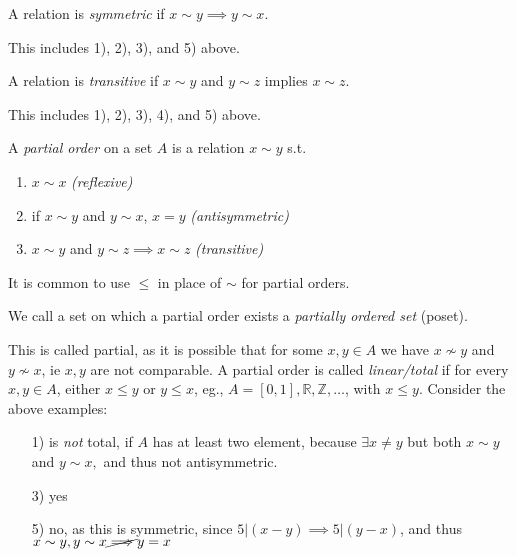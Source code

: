 \documentclass[12pt,oneside]{article}
\begin{document}
\begin{definition}[Symmetric]
  A relation is \emph{symmetric} if $x \sim y \implies y \sim x$.

  This includes 1), 2), 3), and 5) above.
\end{definition}

\begin{definition}[Transitive]
  A relation is \emph{transitive} if $x \sim y$ and $y \sim z$ implies $x \sim z$.

  This includes 1), 2), 3), 4), and 5) above.
\end{definition}

\begin{definition}
  A \emph{partial order} on a set $A$ is a relation $x \sim y$ s.t.
  \begin{enumerate}
    \item $x \sim x$ \textit{(reflexive)}
    \item if $x \sim y$ and $y \sim x$, $x = y$ \textit{(antisymmetric)}
    \item $x \sim y$ and $y \sim z \implies x \sim z$ \textit{(transitive)}
  \end{enumerate}
  It is common to use $\leq$ in place of $\sim$ for partial orders.

  We call a set on which a partial order exists a \emph{partially ordered set} (poset).

  This is called partial, as it is possible that for some $x,y \in A$ we have $x \nsim y$ and $y \nsim x$, ie $x,y$ are not comparable. A partial order is called \emph{linear/total} if for every $x,y\in A$, either $x \leq y$ or $y \leq x$, eg., $A = [0,1], \mathbb{R}, \mathbb{Z}, \dots$, with $x \leq y$. Consider the above examples:

  \begin{itemize}
    \item[1)] is \emph{not} total, if $A$ has at least two element, because $\exists x \neq y$ but both $x \sim y$ and $y \sim x,$ and thus not antisymmetric.
    \item[3)] yes
    \item[5)] no, as this is symmetric, since $5 | (x-y) \implies 5 | (y-x)$, and thus $x \sim y, y \sim x \cancel{\implies} y = x$
  \end{itemize}
\end{definition}
\end{document}
